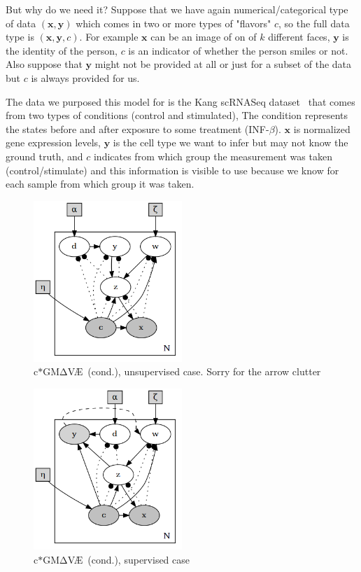 \documentclass[11pt, a4paper]{report}
\theoremstyle{plain}
\theoremstyle{definition}
\theoremstyle{remark}
\newcommand{\x}{\mathbf{x}}
\newcommand{\y}{\mathbf{y}}
\newcommand{\gmvae}{c$\ast$GM$\mathrm{\Delta}$V\AE~}
\begin{document}
But why do we need it?
Suppose that we have again numerical/categorical type of data $(\x, \y)$ which 
comes in two or more types of "flavors" $c$, so the full data type 
is $(\x, \y, c)$. For example $\x$ can be an image of on of $k$ 
different faces, 
$\y$ is the identity of the person, $c$ is an indicator of whether the person
smiles or not. 
Also suppose that $\y$ might not be provided at all or just for
a subset of the data but $c$ is always provided for us.

The data we purposed this model for is the Kang scRNASeq
dataset~\cite{kang2018multiplexed} that comes from two types 
of conditions (control and stimulated), 
The condition represents the states before and after exposure to some treatment
(INF-$\beta$).
$\x$ is normalized gene expression levels, $\y$ is the cell type 
we want to infer but may not know the ground truth, and $c$ indicates from which
group the measurement was taken (control/stimulate) and this information is
visible to use because we know for each sample from which group it was
taken.


\begin{figure}[h]
\centering
\includegraphics[width=0.5\textwidth]{plots/dirichlet_gmm_cvae.v2.gv.png}
\caption{\gmvae (cond.), unsupervised case. Sorry for the arrow clutter}
\label{fig:dirgmmcvae}
\end{figure}

\begin{figure}[h]
\centering
\includegraphics[width=0.5\textwidth]{plots/dirichlet_gmm_cvae_supervised.v2.gv.png}
\caption{\gmvae (cond.), supervised case}
\label{fig:dirgmmcvae_super}
\end{figure}
\end{document}
